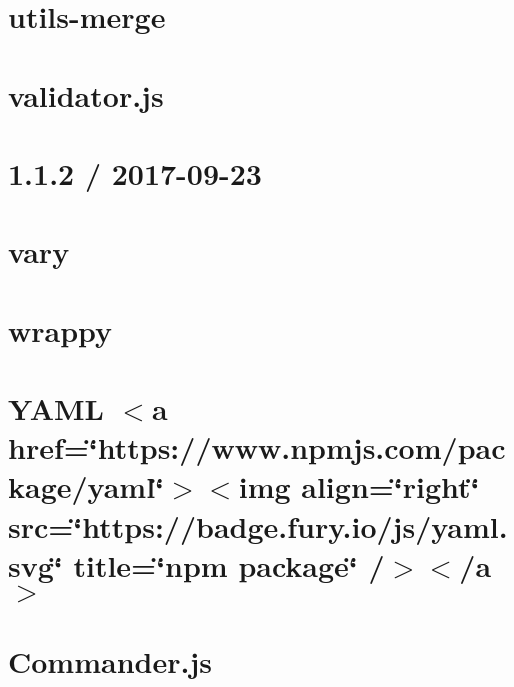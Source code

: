 \documentclass[twoside]{book}
\newcommand{\+}{\discretionary{\mbox{\scriptsize$\hookleftarrow$}}{}{}}
\begin{document}
\chapter{utils-\/merge}
\label{md_src_nodejs_node_modules_utils_merge_README}

\chapter{validator.\+js}
\label{md_src_nodejs_node_modules_validator_README}

\chapter{1.1.2 / 2017-\/09-\/23}
\label{md_src_nodejs_node_modules_vary_HISTORY}

\chapter{vary}
\label{md_src_nodejs_node_modules_vary_README}

\chapter{wrappy}
\label{md_src_nodejs_node_modules_wrappy_README}

\chapter{YAML \texorpdfstring{$<$}{<}a href=\char`\"{}https\+://www.\+npmjs.\+com/package/yaml\char`\"{}\texorpdfstring{$>$}{>}\texorpdfstring{$<$}{<}img align=\char`\"{}right\char`\"{} src=\char`\"{}https\+://badge.\+fury.\+io/js/yaml.\+svg\char`\"{} title=\char`\"{}npm package\char`\"{} /\texorpdfstring{$>$}{>}\texorpdfstring{$<$}{<}/a\texorpdfstring{$>$}{>}}
\label{md_src_nodejs_node_modules_yaml_README}

\chapter{Commander.\+js}
\label{md_src_nodejs_node_modules_z_schema_node_modules_commander_Readme}

\end{document}
